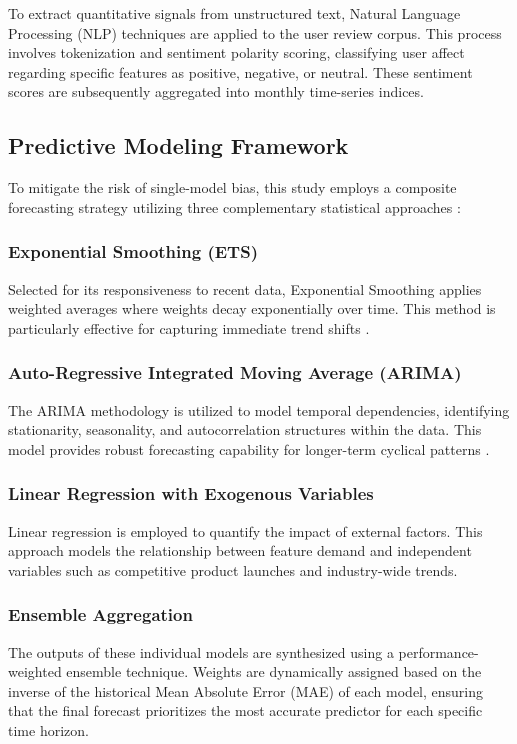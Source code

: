 To extract quantitative signals from unstructured text, Natural Language Processing (NLP) techniques are applied to the user review corpus. This process involves tokenization and sentiment polarity scoring, classifying user affect regarding specific features as positive, negative, or neutral. These sentiment scores are subsequently aggregated into monthly time-series indices.

\subsection{Predictive Modeling Framework}
To mitigate the risk of single-model bias, this study employs a composite forecasting strategy utilizing three complementary statistical approaches \cite{makridakis2018statistical}:

\subsubsection{Exponential Smoothing (ETS)}
Selected for its responsiveness to recent data, Exponential Smoothing applies weighted averages where weights decay exponentially over time. This method is particularly effective for capturing immediate trend shifts \cite{hyndman2008forecasting}.

\subsubsection{Auto-Regressive Integrated Moving Average (ARIMA)}
The ARIMA methodology is utilized to model temporal dependencies, identifying stationarity, seasonality, and autocorrelation structures within the data. This model provides robust forecasting capability for longer-term cyclical patterns \cite{box2015time}.

\subsubsection{Linear Regression with Exogenous Variables}
Linear regression is employed to quantify the impact of external factors. This approach models the relationship between feature demand and independent variables such as competitive product launches and industry-wide trends.

\subsubsection{Ensemble Aggregation}
The outputs of these individual models are synthesized using a performance-weighted ensemble technique. Weights are dynamically assigned based on the inverse of the historical Mean Absolute Error (MAE) of each model, ensuring that the final forecast prioritizes the most accurate predictor for each specific time horizon.

